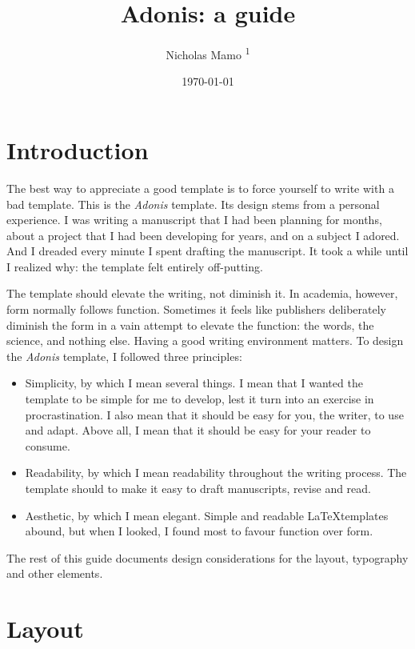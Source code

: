 \documentclass{adonis}
\title{Adonis: a guide}
\author{Nicholas Mamo \textsuperscript{1}}
\affiliation{\textsuperscript{1} Independent}
\date{\today}
\begin{document}
	\maketitle
	
	\section{Introduction}
	
		The best way to appreciate a good template is to force yourself to write with a bad template.
		This is the \textit{Adonis} template.
		Its design stems from a personal experience.
		I was writing a manuscript that I had been planning for months, about a project that I had been developing for years, and on a subject I adored.
		And I dreaded every minute I spent drafting the manuscript.
		It took a while until I realized why: the template felt entirely off-putting.
		
		The template should elevate the writing, not diminish it.
		In academia, however, form normally follows function.
		Sometimes it feels like publishers deliberately diminish the form in a vain attempt to elevate the function: the words, the science, and nothing else.
		Having a good writing environment matters.
		To design the \textit{Adonis} template, I followed three principles:
		
		\begin{itemize}
			\item Simplicity, by which I mean several things.
				  I mean that I wanted the template to be simple for me to develop, lest it turn into an exercise in procrastination.
				  I also mean that it should be easy for you, the writer, to use and adapt.
				  Above all, I mean that it should be easy for your reader to consume.
			
			\item Readability, by which I mean readability throughout the writing process.
				  The template should to make it easy to draft manuscripts, revise and read.
			
			\item Aesthetic, by which I mean elegant.
				  Simple and readable \LaTeX templates abound, but when I looked, I found most to favour function over form.
		\end{itemize}
	
		The rest of this guide documents design considerations for the layout, typography and other elements.
	
	\section{Layout}
	
\end{document}
